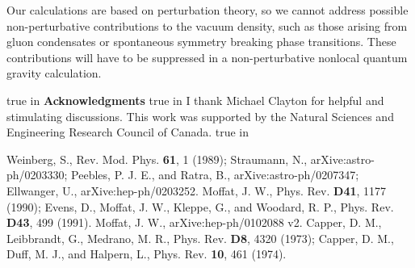 \documentclass[a4paper,11pt]{article}
\begin{document}
Our calculations are based on perturbation theory, so we cannot
address possible non-perturbative contributions to the vacuum
density, such as those arising from gluon condensates or
spontaneous symmetry breaking phase transitions. These
contributions will have to be suppressed in a non-perturbative
nonlocal quantum gravity calculation.

 true in
{\bf Acknowledgments}
 true in
I thank Michael Clayton for helpful and
stimulating discussions. This work was supported by the Natural Sciences and
Engineering Research Council of Canada.   true in

\begin{thebibliography}{100}

 Weinberg, S., Rev. Mod. Phys. {\bf 61}, 1
(1989); Straumann, N., arXive:astro-ph/0203330; Peebles, P. J.
E., and Ratra, B., arXive:astro-ph/0207347; Ellwanger, U., arXive:hep-ph/0203252.
 Moffat, J. W.,
Phys. Rev. {\bf D41}, 1177 (1990); Evens, D., Moffat, J. W.,
Kleppe, G., and Woodard, R. P., Phys. Rev. {\bf D43}, 499
(1991).   Moffat, J. W., arXive:hep-ph/0102088
v2.   Capper, D. M., Leibbrandt, G.,
Medrano, M. R., Phys. Rev. {\bf D8}, 4320 (1973); Capper, D. M.,
Duff, M. J., and Halpern, L., Phys. Rev. {\bf 10}, 461 (1974).

\end{thebibliography}
\end{document}
